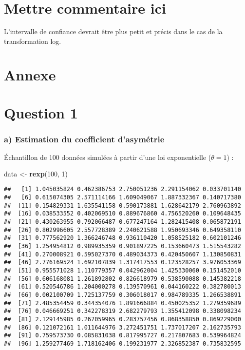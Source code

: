 \documentclass[]{article}
\newenvironment{Shaded}{\begin{snugshade}}{\end{snugshade}}
\newcommand{\KeywordTok}[1]{\textcolor[rgb]{0.13,0.29,0.53}{\textbf{#1}}}
\newcommand{\DecValTok}[1]{\textcolor[rgb]{0.00,0.00,0.81}{#1}}
\newcommand{\StringTok}[1]{\textcolor[rgb]{0.31,0.60,0.02}{#1}}
\newcommand{\NormalTok}[1]{#1}
\begin{document}
\section{Mettre commentaire ici}\label{mettre-commentaire-ici}

L'intervalle de confiance devrait être plus petit et précis dans le cas
de la transformation log.

\newpage

\section{Annexe}\label{annexe}

\section{Question 1}\label{question-1-1}

\subsubsection{a) Estimation du coefficient
d'asymétrie}\label{a-estimation-du-coefficient-dasymetrie-1}

Échantillon de 100 données simulées à partir d'une loi exponentielle
(\(\theta =1\)) :

\begin{Shaded}
\begin{Highlighting}[]
\NormalTok{data <-}\StringTok{  }\KeywordTok{rexp}\NormalTok{(}\DecValTok{100}\NormalTok{, }\DecValTok{1}\NormalTok{)}
\end{Highlighting}
\end{Shaded}

\begin{verbatim}
##   [1] 1.045035824 0.462386753 2.750051236 2.291154062 0.033701140
##   [6] 0.615074305 2.571114166 1.609049067 1.887332367 0.140717380
##  [11] 0.154829331 1.635541158 0.590173881 1.628642179 2.760963892
##  [16] 0.038533552 0.402069510 0.889676860 4.756520260 0.109648435
##  [21] 0.430263955 0.792066487 0.677247164 1.282415408 0.065872191
##  [26] 0.802996605 2.557728389 2.240621588 1.950693346 0.649358110
##  [31] 0.777562920 1.366246748 0.936110420 1.058525182 0.602101246
##  [36] 1.254954812 0.989935359 0.901897225 0.153660473 1.515543282
##  [41] 0.270008921 0.595027370 0.489034373 0.420450607 1.130850831
##  [46] 2.776169524 1.692107839 1.317417553 0.123528257 3.976053369
##  [51] 0.955571028 1.110779357 0.042962004 1.425330060 0.151452010
##  [56] 0.606168081 1.261892802 0.826618979 0.538590088 0.145382218
##  [61] 0.520546786 1.204000278 0.139570961 0.044160222 0.382780013
##  [66] 0.002100709 1.725137759 0.306018017 0.984789335 1.266538891
##  [71] 2.485354459 0.344354076 1.891666884 0.450025352 1.279359689
##  [76] 0.046669251 0.342278319 2.682279793 1.355412098 0.338098234
##  [81] 2.129145985 0.267059965 0.283757456 0.868358850 0.869229000
##  [86] 0.121072161 1.011644976 3.272451751 1.737017207 2.162735793
##  [91] 0.759573730 0.085831038 0.817995727 0.217807683 0.539964824
##  [96] 1.259277469 1.718162406 0.199231977 2.326852387 0.735832595
\end{verbatim}
\end{document}

